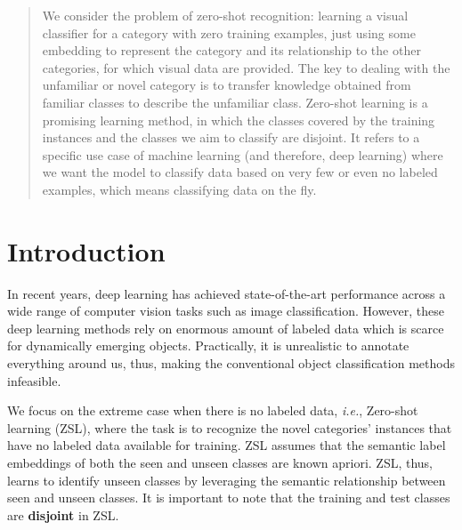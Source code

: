 \documentclass{article}
\begin{document}
\printAffiliationsAndNotice{}


\begin{abstract}
We consider the problem of zero-shot recognition: learning a visual classifier for a category with zero training examples, 
just using some embedding to represent the category and its relationship to the other categories, for which visual data are provided. 
The key to dealing with the unfamiliar or novel category is to transfer knowledge obtained from familiar classes to describe the unfamiliar class. 
Zero-shot learning is a promising learning method, in which the classes covered by the training instances and the classes we aim to classify are disjoint. 
It refers to a specific use case of machine learning (and therefore, deep learning) where we want the model to classify data based on very few or even no labeled examples, 
which means classifying data on the fly.
\end{abstract}


\section{Introduction}
In recent years, deep learning has achieved state-of-the-art performance across a wide range of computer vision tasks such as image classification. 
However, these deep learning methods rely on enormous amount of labeled data which is scarce for dynamically emerging objects. 
Practically, it is unrealistic to annotate everything around us, thus, making the conventional object classification methods infeasible. 

We focus on the extreme case when there is no labeled data, \textit{i.e.}, Zero-shot learning (ZSL), 
where the task is to recognize the novel categories' instances that have no labeled data available for training. 
ZSL assumes that the semantic label embeddings of both the seen and unseen classes are known apriori. 
ZSL, thus, learns to identify unseen classes by leveraging the semantic relationship between seen and unseen classes. 
It is important to note that the training and test classes are \textbf{disjoint} in ZSL.
\end{document}
